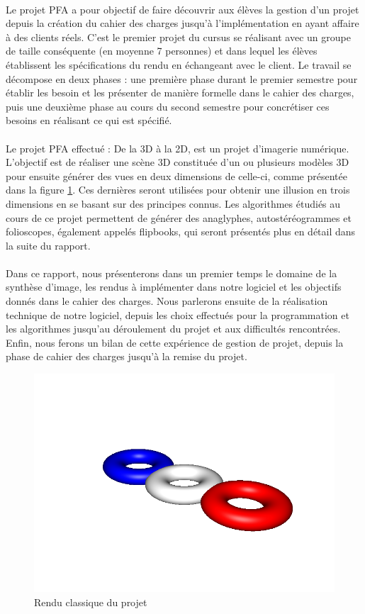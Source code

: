 \paragraph{}
        Le projet PFA a pour objectif de faire découvrir aux élèves la gestion d'un projet depuis la création du cahier des charges jusqu'à l'implémentation en ayant affaire à des clients réels. C'est le premier projet du cursus se réalisant avec un groupe de taille conséquente (en moyenne 7 personnes) et dans lequel les élèves établissent les spécifications du rendu en échangeant avec le client. Le travail se décompose en deux phases : une première phase durant le premier semestre pour établir les besoin et les présenter de manière formelle dans le cahier des charges, puis une deuxième phase au cours du second semestre pour concrétiser ces besoins en réalisant ce qui est spécifié.

\paragraph{}      
        Le projet PFA effectué : De la 3D à la 2D, est un projet d'imagerie numérique. L'objectif est de réaliser une scène 3D constituée d'un ou plusieurs modèles 3D pour ensuite générer des vues en deux dimensions de celle-ci, comme présentée dans la figure \ref{fig:3Don}. Ces dernières seront utilisées pour obtenir une illusion en trois dimensions en se basant sur des principes connus. Les algorithmes étudiés au cours de ce projet permettent de générer des anaglyphes, autostéréogrammes et folioscopes, également appelés flipbooks,  qui seront présentés plus en détail dans la suite du rapport.
        
\paragraph{}
        Dans ce rapport, nous présenterons dans un premier temps le domaine de la synthèse d'image, les rendus à implémenter dans notre logiciel et les objectifs donnés dans le cahier des charges. Nous parlerons ensuite de la réalisation technique de notre logiciel, depuis les choix effectués pour la programmation et les algorithmes jusqu'au déroulement du projet et aux difficultés rencontrées. Enfin, nous ferons un bilan de cette expérience de gestion de projet, depuis la phase de cahier des charges jusqu'à la remise du projet.

\begin{figure}[h]
	\centering
	\includegraphics[scale=0.4]{3donut_rendu.png}
	\caption{\label{fig:3Don} Rendu classique du projet \protect}
\end{figure}
